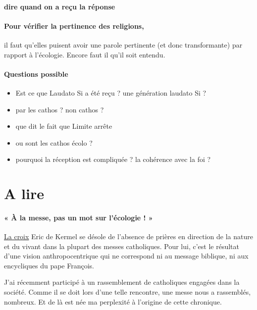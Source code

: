 \paragraph{dire quand on a reçu la réponse}


\paragraph{Pour vérifier la pertinence des religions, } il faut qu'elles puisent avoir une parole pertinente (et donc transformante) par rapport à l'écologie. Encore faut il qu'il soit entendu.

\paragraph{Questions possible}
\begin{itemize}
    \item Est ce que Laudato Si a été reçu ? une génération laudato Si ?
    \item par les cathos ? non cathos ?
    \item que dit le fait que Limite arrête
    \item ou sont les cathos écolo ?
    \item pourquoi la réception est compliquée ? la cohérence avec la foi ? 
\end{itemize}



\section{A lire}

\paragraph{« À la messe, pas un mot sur l’écologie ! »}
\href{https://www.la-croix.com/Debats/A-messe-pas-mot-lecologie-2022-11-13-1201241840?utm_source=newsletter&utm_medium=email&utm_campaign=NEWSLETTER__CRX_REL_EDITO&utm_content=20221114}{La croix}
Eric de Kermel se désole de l’absence de prières en direction de la nature et du vivant dans la plupart des messes catholiques. Pour lui, c’est le résultat d’une vision anthropocentrique qui ne correspond ni au message biblique, ni aux encycliques du pape François.
 
 
J’ai récemment participé à un rassemblement de catholiques engagées dans la société. Comme il se doit lors d’une telle rencontre, une messe nous a rassemblés, nombreux. Et de là est née ma perplexité à l’origine de cette chronique.

